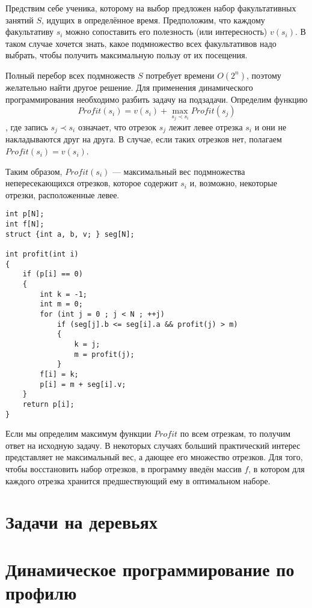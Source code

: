 \documentclass[14pt,openany]{book}
\begin{document}
Предствим себе ученика, которому на выбор предложен набор факультативных занятий $S$, идущих
в определённое время. Предположим, что каждому факультативу $s_i$ можно сопоставить
его полезность (или интересность) $v(s_i)$. В таком случае хочется знать, какое подмножество
всех факультативов надо выбрать, чтобы получить максимальную пользу от их посещения.

Полный перебор всех подмножеств $S$ потребует времени $O(2^n)$, поэтому желательно найти другое
решение. Для применения динамического программирования необходимо разбить задачу на подзадачи.
Определим функцию
$$Profit(s_i) = v(s_i) + \max_{s_j \prec s_i}Profit(s_j)$$,
где запись $s_j \prec s_i$ означает, что отрезок $s_j$ лежит левее отрезка $s_i$ и они
не накладываются друг на друга. В случае, если таких отрезков нет, полагаем
$Profit(s_i) = v(s_i)$.

Таким образом, $Profit(s_i)$ --- максимальный вес подмножества непересекающихся отрезков,
которое содержит $s_i$ и, возможно, некоторые отрезки, расположенные левее.

\begin{lstlisting}
int p[N];
int f[N];
struct {int a, b, v; } seg[N];

int profit(int i)
{
    if (p[i] == 0)
    {
        int k = -1;
        int m = 0;
        for (int j = 0 ; j < N ; ++j)
            if (seg[j].b <= seg[i].a && profit(j) > m)
            {
                k = j;
                m = profit(j);
            }
        f[i] = k;
        p[i] = m + seg[i].v;
    }
    return p[i];
}
\end{lstlisting}

Если мы определим максимум функции $Profit$ по всем отрезкам, то получим ответ на исходную задачу.
В некоторых случаях больший практический интерес представляет не максимальный вес, а дающее его
множество отрезков. Для того, чтобы восстановить набор отрезков, в программу введён массив $f$,
в котором для каждого отрезка хранится предшествующий ему в оптимальном наборе.





\chapter{Задачи на деревьях}

\chapter{Динамическое программирование по профилю}
\end{document}
